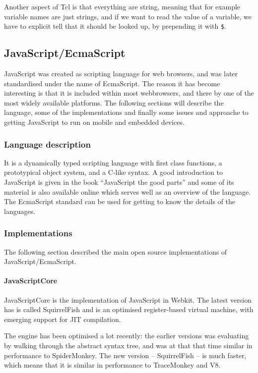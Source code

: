 \documentclass[11pt]{report}
\begin{document}
Another aspect of Tcl is that everything are string, meaning that for example variable names are just strings, and if we want to read the value of a variable, we have to explicit tell that it should be looked up, by prepending it with \verb|$|.

\subsection{JavaScript/EcmaScript}
\label{JavaScript}
JavaScript was created as scripting language for web browsers, and was later standardised under the name of EcmaScript.
The reason it has become interesting is that it is included within most webbrowsers, and there by one of the most widely available platforms.
The following sections will describe the language, some of the implementations and finally some issues and approache to getting JavaScript to run on mobile and embedded devices.

\subsubsection{Language description}
It is a dynamically typed scripting language with first class functions, a prototypical object system, and a C-like syntax.
A good introduction to JavaScript is given in the book ``JavaScript the good parts''\cite{goodparts} and some of its material is also available online \cite{crockford-javascript-web} which serves well as an overview of the language. The EcmaScript standard \cite{ecma-262} can be used for getting to know the details of the languages.


\subsubsection{Implementations}
The following section described the main open source implementations of JavaScript/EcmaScript.

\paragraph{JavaScriptCore} 
JavaScriptCore is the implementation of JavaScript in Webkit.
The latest version has is called SquirrelFish and is an optimised register-based virtual machine,
with emerging support for JIT compilation.

The engine has been optimised a lot recently: the earlier versions was evaluating by walking through the abstract syntax tree, and was at that that time similar in performance to SpiderMonkey.
The new version -- SquirrelFish -- is much faster, which means that it is similar in performance to TraceMonkey and V8.
\end{document}
